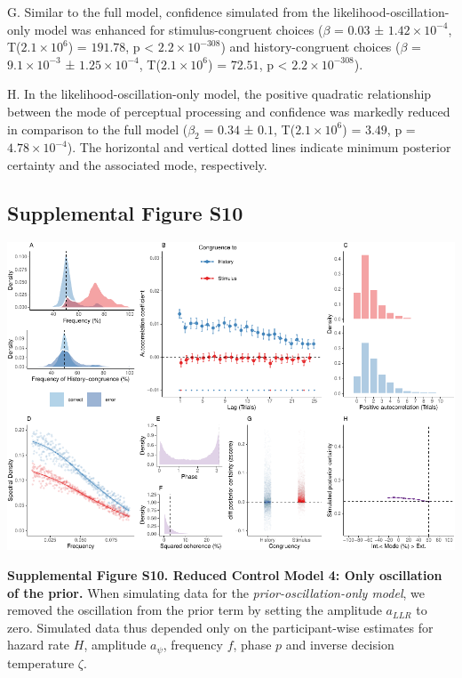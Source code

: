 \documentclass[
]{article}
\begin{document}
G. Similar to the full model, confidence simulated from the
likelihood-oscillation-only model was enhanced for stimulus-congruent
choices (\(\beta\) = \(0.03\) ± \(\ensuremath{1.42\times 10^{-4}}\),
T(\(\ensuremath{2.1\times 10^{6}}\)) = \(191.78\), p < \(\ensuremath{2.2\times 10^{-308}}\)) and
history-congruent choices (\(\beta\) =
\(\ensuremath{9.1\times 10^{-3}}\) ±
\(\ensuremath{1.25\times 10^{-4}}\),
T(\(\ensuremath{2.1\times 10^{6}}\)) = \(72.51\), p < \(\ensuremath{2.2\times 10^{-308}}\)).

H. In the likelihood-oscillation-only model, the positive quadratic
relationship between the mode of perceptual processing and confidence
was markedly reduced in comparison to the full model (\(\beta_2\) =
\(0.34\) ± \(0.1\), T(\(\ensuremath{2.1\times 10^{6}}\)) = \(3.49\), p =
\(\ensuremath{4.78\times 10^{-4}}\)). The horizontal and vertical dotted
lines indicate minimum posterior certainty and the associated mode,
respectively.

\newpage

\hypertarget{supplemental-figure-s10}{%
\subsection{Supplemental Figure S10}\label{supplemental-figure-s10}}

\includegraphics{modes_mouse_files/figure-latex/Supplemental_Figure_S10-1.pdf}

\textbf{Supplemental Figure S10. Reduced Control Model 4: Only
oscillation of the prior.} When simulating data for the
\emph{prior-oscillation-only model}, we removed the oscillation from the
prior term by setting the amplitude \(a_{LLR}\) to zero. Simulated data
thus depended only on the participant-wise estimates for hazard rate
\(H\), amplitude \(a_{\psi}\), frequency \(f\), phase \(p\) and inverse
decision temperature \(\zeta\).
\end{document}
